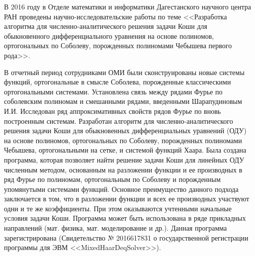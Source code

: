 \Conclusion

В 2016 году в Отделе математики и информатики Дагестанского научного центра РАН проведены научно-исследовательские работы по теме
<<Разработка алгоритма для численно-аналитического решения задачи Коши для обыкновенного дифференциального уравнения на основе полиномов, ортогональных по Соболеву, порожденных полиномами Чебышева первого рода>>.



В отчетный период сотрудниками ОМИ были сконструированы новые системы функций, ортогональные в смысле Соболева, порожденные классическими ортогональными системами. Установлена связь между рядами Фурье по соболевским полиномам и смешанными рядами, введенными Шарапудиновым И.И.
Исследован ряд аппроксимативных свойств рядов Фурье по вновь построенным системам. Разработан алгоритм для численно-аналитического решения задачи Коши для обыкновенных дифференциальных уравнений (ОДУ) на основе полиномов, ортогональных по Соболеву, порожденных полиномами Чебышева, ортогональными на сетке, и системой функций Хаара.
Была создана программа, которая позволяет найти решение задачи Коши для линейных ОДУ численным методом, основанным на разложении функции и ее производных в ряд Фурье по полиномам, ортогональным по Соболеву и порожденным упомянутыми системами функций. Основное преимущество данного подхода заключается в том, что в разложении  функции и всех ее производных участвуют одни и те же коэффициенты.
При этом оказываются учтенными начальные условия задачи Коши. Программа может быть использована в ряде прикладных направлений (мат. физика, мат. моделирование и др.). Данная программа зарегистрирована (Свидетельство № 2016617831 о государственной регистрации программы для ЭВМ <<MixedHaarDeqSolver>>).




